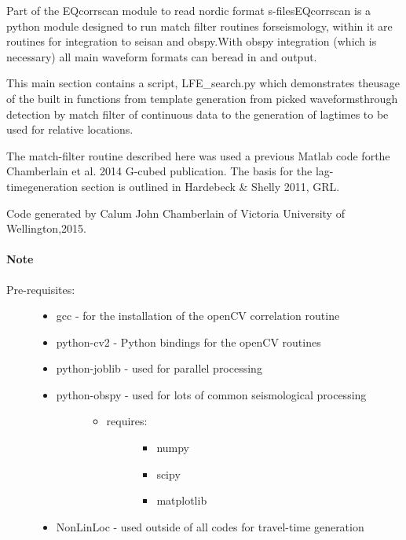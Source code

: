 \documentclass[a4paper,10pt,english]{sphinxmanual}
\begin{document}
Part of the EQcorrscan module to read nordic format s-filesEQcorrscan is a python module designed to run match filter routines forseismology, within it are routines for integration to seisan and obspy.With obspy integration (which is necessary) all main waveform formats can beread in and output.

This main section contains a script, LFE\_search.py which demonstrates theusage of the built in functions from template generation from picked waveformsthrough detection by match filter of continuous data to the generation of lagtimes to be used for relative locations.

The match-filter routine described here was used a previous Matlab code forthe Chamberlain et al. 2014 G-cubed publication.  The basis for the lag-timegeneration section is outlined in Hardebeck \& Shelly 2011, GRL.

Code generated by Calum John Chamberlain of Victoria University of Wellington,2015.
\paragraph{Note}
\begin{description}
\item[{Pre-requisites:}] \leavevmode\begin{itemize}
\item {} 
gcc             - for the installation of the openCV correlation routine

\item {} 
python-cv2      - Python bindings for the openCV routines

\item {} 
python-joblib   - used for parallel processing

\item {} \begin{description}
\item[{python-obspy    - used for lots of common seismological processing}] \leavevmode\begin{itemize}
\item {} \begin{description}
\item[{requires:}] \leavevmode\begin{itemize}
\item {} 
numpy

\item {} 
scipy

\item {} 
matplotlib

\end{itemize}

\end{description}

\end{itemize}

\end{description}

\item {} 
NonLinLoc       - used outside of all codes for travel-time generation

\end{itemize}

\end{description}
\end{document}
